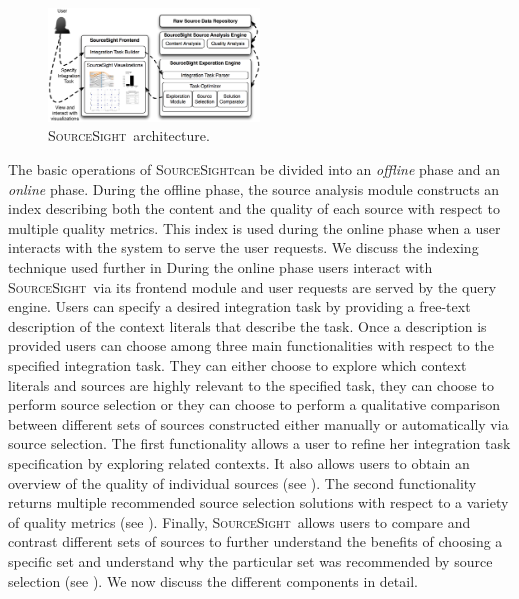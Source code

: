 \documentclass{vldb}
\newcommand\system{\textsc{SourceSight}}
\begin{document}
\begin{figure}[h]
    \centering
    \includegraphics[width=0.5\textwidth]{fig/srcsightOver}
    \caption{\system~architecture.}
    \label{fig:architecture}
\end{figure}

The basic operations of \system can be divided into an {\em offline} phase and an {\em online} phase. During the offline phase, the source analysis module constructs an index describing both the content and the quality of each source with respect to multiple quality metrics. This index is used during the online phase when a user interacts with the system to serve the user requests. We discuss the indexing technique used further in  During the online phase users interact with \system~via its frontend module and user requests are served by the query engine. Users can specify a desired integration task by providing a free-text description of the context literals that describe the task. Once a description is provided users can choose among three main functionalities with respect to the specified integration task. They can either choose to explore which context literals and sources are highly relevant to the specified task, they can choose to perform source selection or they can choose to perform a qualitative comparison between different sets of sources constructed either manually or automatically via source selection. The first functionality allows a user to refine her integration task specification by exploring related contexts. It also allows users to obtain an overview of the quality of individual sources (see ). The second functionality returns multiple recommended source selection solutions with respect to a variety of quality metrics (see ). Finally, \system~allows users to compare and contrast different sets of sources to further understand the benefits of choosing a specific set and understand why the particular set was recommended by source selection (see ). We now discuss the different components in detail.
\end{document}
